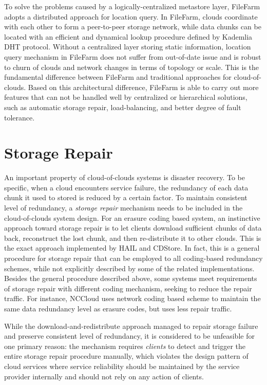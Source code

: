 To solve the problems caused by a logically-centralized metastore layer, FileFarm adopts a distributed approach for location query. In FileFarm, clouds coordinate with each other to form a peer-to-peer storage network, while data chunks can be located with an efficient and dynamical lookup procedure defined by Kademlia\cite{maymounkov2002kademlia} DHT protocol. Without a centralized layer storing static information, location query mechanism in FileFarm does not suffer from out-of-date issue and is robust to churn of clouds and network changes in terms of topology or scale. This is the fundamental difference between FileFarm and traditional approaches for cloud-of-clouds. Based on this architectural difference, FileFarm is able to carry out more features that can not be handled well by centralized or hierarchical solutions, such as automatic storage repair, load-balancing, and better degree of fault tolerance.

\section{Storage Repair}
\label{ss:cocstoragerepair}

An important property of cloud-of-clouds systems is disaster recovery. To be specific, when a cloud encounters service failure, the redundancy of each data chunk it used to stored is reduced by a certain factor. To maintain consistent level of redundancy, a \textit{storage repair} mechanism needs to be included in the cloud-of-clouds system design. For an erasure coding based system, an instinctive approach toward storage repair is to let clients download sufficient chunks of data back, reconstruct the lost chunk, and then re-distribute it to other clouds. This is the exact approach implemented by HAIL\cite{bowers2009hail} and CDStore\cite{li2015cdstore}. In fact, this is a general procedure for storage repair that can be employed to all coding-based redundancy schemes, while not explicitly described by some of the related implementations. Besides the general procedure described above, some systems meet requirements of storage repair with different coding mechanism, seeking to reduce the repair traffic. For instance, NCCloud\cite{hu2012nccloud} uses network coding based scheme to maintain the same data redundancy level as erasure codes, but uses less repair traffic.

While the download-and-redistribute approach managed to repair storage failure and preserve consistent level of redundancy, it is considered to be unfeasible for one primary reason: the mechanism requires \textit{clients} to detect and trigger the entire storage repair procedure manually, which violates the design pattern of cloud services where service reliability should be maintained by the service provider internally and should not rely on any action of clients.

